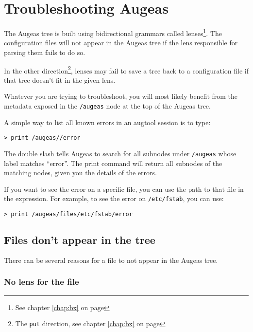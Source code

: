 \chapter{Troubleshooting Augeas}

\label{chap:troubleshooting} 

The Augeas tree is built using bidirectional grammars called lenses\footnote{See chapter \ref{chap:bx} on page \pageref{chap:bx}}. The configuration files will not appear in the Augeas tree if the lens responsible for parsing them fails to do so.

In the other direction\footnote{The \verb!put! direction, see chapter \ref{chap:bx} on page \pageref{chap:bx}}, lenses may fail to save a tree back to a configuration file if that tree doesn't fit in the given lens.

Whatever you are trying to troubleshoot, you will most likely benefit from the metadata exposed in the \verb!/augeas! node at the top of the Augeas tree.

A simple way to list all known errors in an augtool session is to type:

 

\begin{verbatim}
> print /augeas//error
\end{verbatim}
The double slash tells Augeas to search for all subnodes under \verb!/augeas! whose label matches ``error''. The print command will return all subnodes of the matching nodes, given you the details of the errors.

If you want to see the error on a specific file, you can use the path to that file in the expression. For example, to see the error on \verb!/etc/fstab!, you can use:

 

\begin{verbatim}
> print /augeas/files/etc/fstab/error
\end{verbatim}
\section{Files don't appear in the tree}

There can be several reasons for a file to not appear in the Augeas tree.

\subsection{No lens for the file}


